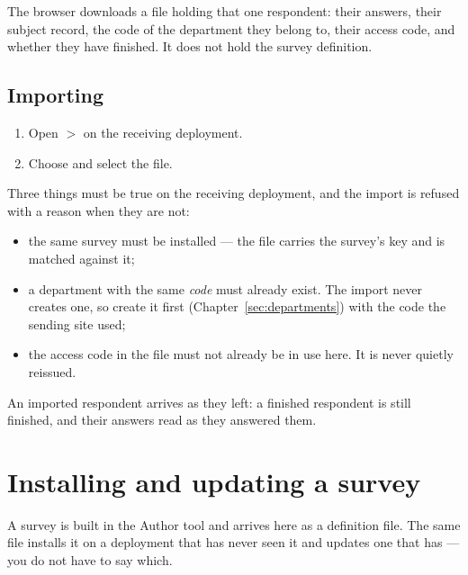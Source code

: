 \documentclass[11pt, a4paper]{article}
\newcommand{\adminonly}{%
  \marginpar{\raggedright\footnotesize\textcolor{elicitVerdigris}{\textsf{Administrator}}}%
}
\begin{document}
The browser downloads a  file holding that one respondent: their answers, their
subject record, the code of the department they belong to, their access code, and whether they
have finished. It does not hold the survey definition.

\subsection{Importing}

\begin{enumerate}
  \item Open  $>$  on the receiving deployment.
  \item Choose  and select the  file.
\end{enumerate}


Three things must be true on the receiving deployment, and the import is refused with a reason
when they are not:

\begin{itemize}
  \item the same survey must be installed — the file carries the survey's key and is matched
        against it;
  \item a department with the same \emph{code} must already exist. The import never creates one,
        so create it first (Chapter~\ref{sec:departments}) with the code the sending site used;
  \item the access code in the file must not already be in use here. It is never quietly
        reissued.
\end{itemize}

An imported respondent arrives as they left: a finished respondent is still finished, and their
answers read as they answered them.

\section{Installing and updating a survey}\adminonly
\label{sec:install}

A survey is built in the Author tool and arrives here as a  definition file. The
same file installs it on a deployment that has never seen it and updates one that has — you do
not have to say which.
\end{document}
